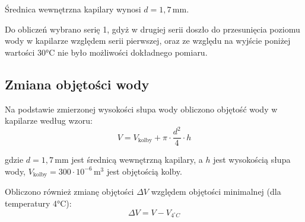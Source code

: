 \documentclass[a4paper,12pt]{article}
\begin{document}
Średnica wewnętrzna kapilary wynosi $d = 1{,}7\,\text{mm}$.

Do obliczeń wybrano serię 1, gdyż w drugiej serii doszło do przesunięcia poziomu wody w kapilarze względem serii pierwszej, oraz ze względu na wyjście poniżej wartości 30°C nie było możliwości dokładnego pomiaru.

\subsection{Zmiana objętości wody}

Na podstawie zmierzonej wysokości słupa wody obliczono objętość wody w kapilarze według wzoru:
\begin{equation}
    V = V_{\text{kolby}} +\pi \cdot \frac{d^2}{4} \cdot h
\end{equation}

gdzie $d = 1{,}7\,\text{mm}$ jest średnicą wewnętrzną kapilary, a $h$ jest wysokością słupa wody, $V_{\text{kolby}} = 300 \cdot 10^{-6}\,\text{m}^3$ jest objętością kolby.

Obliczono również zmianę objętości $\Delta V$ względem objętości minimalnej (dla temperatury 4°C):
\begin{equation}
    \Delta V = V - V_{4^\circ C}
\end{equation}
\end{document}
